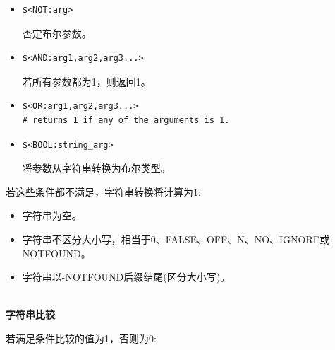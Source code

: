 \begin{itemize}
\item 
\begin{lstlisting}[style=styleCMake]
$<NOT:arg> 
\end{lstlisting}

否定布尔参数。

\item 
\begin{lstlisting}[style=styleCMake]
$<AND:arg1,arg2,arg3...> 
\end{lstlisting}

若所有参数都为1，则返回1。

\item 
\begin{lstlisting}[style=styleCMake]
$<OR:arg1,arg2,arg3...> 
# returns 1 if any of the arguments is 1.
\end{lstlisting}

\item 
\begin{lstlisting}[style=styleCMake]
$<BOOL:string_arg> 
\end{lstlisting}

将参数从字符串转换为布尔类型。
\end{itemize}

若这些条件都不满足，字符串转换将计算为1:

\begin{itemize}
\item 
字符串为空。

\item 
字符串不区分大小写，相当于0、FALSE、OFF、N、NO、IGNORE或NOTFOUND。

\item 
字符串以-NOTFOUND后缀结尾(区分大小写)。
\end{itemize}

\hspace*{\fill} \\ %
\noindent
\textbf{字符串比较}

若满足条件比较的值为1，否则为0:

